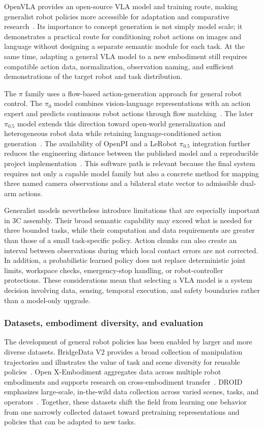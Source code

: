 OpenVLA provides an open-source VLA model and training route, making generalist robot policies more accessible for adaptation and comparative research~\cite{openvla}. Its importance to concept generation is not simply model scale; it demonstrates a practical route for conditioning robot actions on images and language without designing a separate semantic module for each task. At the same time, adapting a general VLA model to a new embodiment still requires compatible action data, normalization, observation naming, and sufficient demonstrations of the target robot and task distribution.

The $\pi$ family uses a flow-based action-generation approach for general robot control. The $\pi_0$ model combines vision-language representations with an action expert and predicts continuous robot actions through flow matching~\cite{pi0}. The later $\pi_{0.5}$ model extends this direction toward open-world generalization and heterogeneous robot data while retaining language-conditioned action generation~\cite{pi05}. The availability of OpenPI and a LeRobot $\pi_{0.5}$ integration further reduces the engineering distance between the published model and a reproducible project implementation~\cite{openpi,lerobotpi05}. This software path is relevant because the final system requires not only a capable model family but also a concrete method for mapping three named camera observations and a bilateral state vector to admissible dual-arm actions.

Generalist models nevertheless introduce limitations that are especially important in 3C assembly. Their broad semantic capability may exceed what is needed for three bounded tasks, while their computation and data requirements are greater than those of a small task-specific policy. Action chunks can also create an interval between observations during which local contact errors are not corrected. In addition, a probabilistic learned policy does not replace deterministic joint limits, workspace checks, emergency-stop handling, or robot-controller protections. These considerations mean that selecting a VLA model is a system decision involving data, sensing, temporal execution, and safety boundaries rather than a model-only upgrade.

\subsubsection{Datasets, embodiment diversity, and evaluation}

The development of general robot policies has been enabled by larger and more diverse datasets. BridgeData V2 provides a broad collection of manipulation trajectories and illustrates the value of task and scene diversity for reusable policies~\cite{bridgev2}. Open X-Embodiment aggregates data across multiple robot embodiments and supports research on cross-embodiment transfer~\cite{openx}. DROID emphasizes large-scale, in-the-wild data collection across varied scenes, tasks, and operators~\cite{droid}. Together, these datasets shift the field from learning one behavior from one narrowly collected dataset toward pretraining representations and policies that can be adapted to new tasks.

